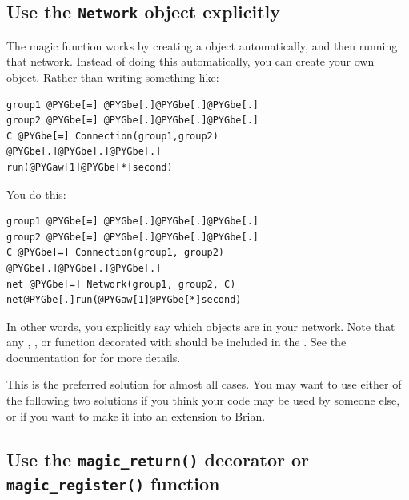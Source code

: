 \documentclass[letterpaper,10pt]{manual}
\begin{document}
\hypertarget{index-101}{}\subsection{Use the \texttt{Network} object explicitly}

The magic \hyperlink{brian.run}{} function works by creating a \hyperlink{brian.Network}{}
object automatically, and then running that network. Instead of doing
this automatically, you can create your own \hyperlink{brian.Network}{} object.
Rather than writing something like:

\begin{Verbatim}[commandchars=@\[\]]
group1 @PYGbe[=] @PYGbe[.]@PYGbe[.]@PYGbe[.]
group2 @PYGbe[=] @PYGbe[.]@PYGbe[.]@PYGbe[.]
C @PYGbe[=] Connection(group1,group2)
@PYGbe[.]@PYGbe[.]@PYGbe[.]
run(@PYGaw[1]@PYGbe[*]second)
\end{Verbatim}

You do this:

\begin{Verbatim}[commandchars=@\[\]]
group1 @PYGbe[=] @PYGbe[.]@PYGbe[.]@PYGbe[.]
group2 @PYGbe[=] @PYGbe[.]@PYGbe[.]@PYGbe[.]
C @PYGbe[=] Connection(group1, group2)
@PYGbe[.]@PYGbe[.]@PYGbe[.]
net @PYGbe[=] Network(group1, group2, C)
net@PYGbe[.]run(@PYGaw[1]@PYGbe[*]second)
\end{Verbatim}

In other words, you explicitly say which objects are in your network.
Note that any \hyperlink{brian.NeuronGroup}{}, \hyperlink{brian.Connection}{},  or
function decorated with \hyperlink{brian.network_operation}{} should be included in the
\hyperlink{brian.Network}{}. See the documentation for \hyperlink{brian.Network}{} for more details.

This is the preferred solution for almost all cases. You may want to use either
of the following two solutions if you think your code may be used by someone
else, or if you want to make it into an extension to Brian.

\subsection{Use the \texttt{magic\_return()} decorator or \texttt{magic\_register()} function}
\end{document}
